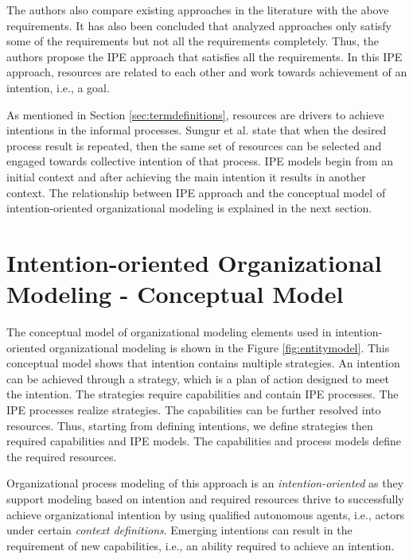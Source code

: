 The authors also compare existing approaches in the literature with the above requirements. It has also been concluded that analyzed approaches only satisfy some of the requirements but not all the requirements completely. Thus, the authors propose the IPE approach that satisfies all the requirements. In this IPE approach, resources are related to each other and work towards achievement of an intention, i.e., a goal.   

As mentioned in Section \ref{sec:termdefinitions}, resources are drivers to achieve intentions in the informal processes. Sungur et al. \cite{Sungur2014a} state that when the desired process result is repeated, then the same set of resources can be selected and engaged towards collective intention of that process. IPE models begin from an initial context and after achieving the main intention it results in another context. The relationship between IPE approach and the conceptual model of intention-oriented organizational modeling is explained in the next section.

\section{Intention-oriented Organizational Modeling - Conceptual Model}
\label{sec:entitytypesrepresentation}
The conceptual model of organizational modeling elements used in intention-oriented organizational modeling is shown in the Figure \ref{fig:entitymodel}. This conceptual model shows that intention contains multiple strategies. An intention can be achieved through a strategy, which is a plan of action designed to meet the intention. The strategies require capabilities and contain IPE processes. The IPE processes realize strategies. The capabilities can be further resolved into resources. Thus, starting from defining intentions, we define strategies then required capabilities and IPE models. The capabilities and process models define the required resources. 

Organizational process modeling of this approach is an \textit{intention-oriented} as they support modeling based on intention and required resources thrive to successfully achieve organizational intention by using qualified autonomous agents, i.e., actors under certain \textit{context definitions}. Emerging intentions can result in the requirement of new capabilities, i.e., an ability required to achieve an intention.

